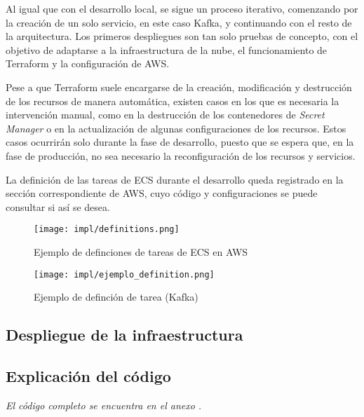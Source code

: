 Al igual que con el desarrollo local, se sigue un proceso iterativo, comenzando
por la creación de un solo servicio, en este caso Kafka, y continuando con el
resto de la arquitectura. Los primeros despliegues son tan solo pruebas de
concepto, con el objetivo de adaptarse a la infraestructura de la nube, el
funcionamiento de Terraform y la configuración de AWS.

Pese a que Terraform suele encargarse de la creación, modificación y destrucción
de los recursos de manera automática, existen casos en los que es necesaria la
intervención manual, como en la destrucción de los contenedores de
\textit{Secret Manager} o en la actualización de algunas configuraciones de los
recursos. Estos casos ocurrirán solo durante la fase de desarrollo, puesto que
se espera que, en la fase de producción, no sea necesario la reconfiguración de
los recursos y servicios.

La definición de las tareas de ECS durante el desarrollo queda registrado en la
sección correspondiente de AWS, cuyo código y configuraciones se puede consultar
si así se desea.

\begin{figure}[H]
	\centering
	\texttt{[image: impl/definitions.png]}
	\caption{Ejemplo de definciones de tareas de ECS en AWS}
	\label{fig:definitions}
\end{figure}

\begin{figure}[H]
	\centering
	\texttt{[image: impl/ejemplo\_definition.png]}
	\caption{Ejemplo de definción de tarea (Kafka)}
	\label{fig:definition}
\end{figure}


\newpage{}
\subsection{Despliegue de la infraestructura}\label{subsec:impl_cloud_despliegue}


\newpage{}
\subsection{Explicación del código}\label{sec:impl_configuracion}
\emph{El código completo se encuentra en el anexo .}

